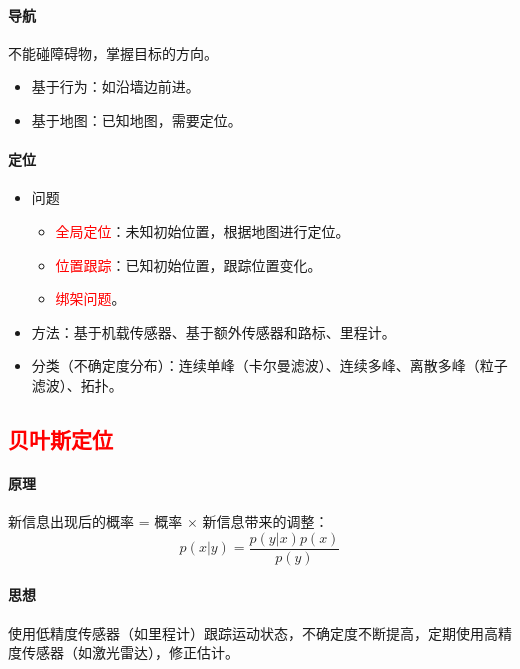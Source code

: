 \documentclass[
12pt, %
a4paper, 
oneside, %
]{scrartcl}
\begin{document}
\paragraph{导航}
不能碰障碍物，掌握目标的方向。
\begin{itemize}
\item 基于行为：如沿墙边前进。
\item 基于地图：已知地图，需要定位。
\end{itemize}
\paragraph{定位}
\begin{itemize}
\item 问题
\begin{itemize}
\item \textcolor{red}{全局定位}：未知初始位置，根据地图进行定位。
\item \textcolor{red}{位置跟踪}：已知初始位置，跟踪位置变化。
\item \textcolor{red}{绑架问题}。
\end{itemize}
\item 方法：基于机载传感器、基于额外传感器和路标、里程计。
\item 分类（不确定度分布）：连续单峰（卡尔曼滤波）、连续多峰、离散多峰（粒子滤波）、拓扑。
\end{itemize}
\subsection[贝叶斯定位]{\textcolor{red}{贝叶斯定位}}
\paragraph{原理}
新信息出现后的概率 = 概率 $ \times $ 新信息带来的调整：
$$ p(x|y) = \frac{p(y|x)p(x)}{p(y)} $$
\paragraph{思想}
使用低精度传感器（如里程计）跟踪运动状态，不确定度不断提高，定期使用高精度传感器（如激光雷达），修正估计。
\end{document}
